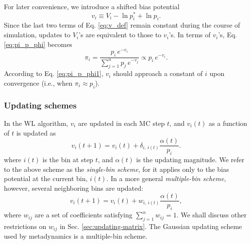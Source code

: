 \documentclass[reprint, floatfix]{revtex4-1}
\begin{document}
For later convenience, we introduce a shifted bias potential
%
\begin{equation}
  v_i \equiv V_i - \ln p^*_i + \ln p_i.
  \label{eq:v_def}
\end{equation}
%
Since the last two terms of Eq. \eqref{eq:v_def}
remain constant during the course of simulation,
updates to $V_i$'s are equivalent to those to $v_i$'s.
%
In terms of $v_i$'s, Eq. \eqref{eq:pi_p_phi}
becomes
%
\begin{equation}
  \pi_i
  =
  \frac{                p_i \, e^{-v_i} }
       { \sum_{j = 1}^n p_j \, e^{-v_j} }
  \propto
  p_i \, e^{-v_i}.
  \label{eq:pi_p_v}
\end{equation}
%
According to Eq. \eqref{eq:pi_p_phi1},
$v_i$ should approach a constant of $i$
upon convergence (i.e., when $\pi_i \approx p_i$).




\subsubsection{Updating schemes}



In the WL algorithm\cite{wang2001, wang2001pre},
$v_i$ are updated
in each MC step $t$,
and $v_i(t)$ as a function of $t$
is updated as
%
\begin{equation}
  v_i(t+1)
  =
  v_i(t)
  +
  \delta_{i, \, i(t)}
  \frac{ \alpha(t) } { p_i }.
  \label{eq:wl_update}
\end{equation}
%
where $i(t)$ is the bin at step $t$,
and $\alpha(t)$ is the updating magnitude.
%
We refer to the above scheme as the \emph{single-bin scheme},
for it applies only to the bias potential
at the current bin, $i(t)$.
%
In a more general \emph{multiple-bin scheme}, however,
several neighboring bins are updated:
%
\begin{equation}
  v_i(t+1)
  =
  v_i(t)
  +
  w_{i, \, i(t)}
  \frac{ \alpha(t) } { p_i },
  \label{eq:mbin_update}
\end{equation}
%
where $w_{ij}$ are a set of coefficients satisfying
$\sum_{j=1}^n w_{ij} = 1$.
%
We shall discuss other restrictions on $w_{ij}$
in Sec. \ref{sec:updating-matrix}.
%
The Gaussian updating scheme
used by metadynamics
is a multiple-bin scheme.
\end{document}

